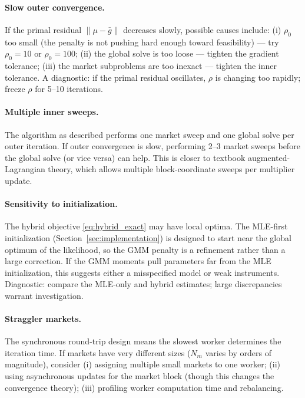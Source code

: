 \documentclass[11pt]{article}
\begin{document}
\paragraph{Slow outer convergence.} If the primal residual $\|\mu-\bar g\|$ decreases slowly, possible causes include: (i) $\rho_0$ too small (the penalty is not pushing hard enough toward feasibility) --- try $\rho_0 = 10$ or $\rho_0 = 100$; (ii) the global solve is too loose --- tighten the gradient tolerance; (iii) the market subproblems are too inexact --- tighten the inner tolerance. A diagnostic: if the primal residual oscillates, $\rho$ is changing too rapidly; freeze $\rho$ for 5--10 iterations.

\paragraph{Multiple inner sweeps.} The algorithm as described performs one market sweep and one global solve per outer iteration. If outer convergence is slow, performing 2--3 market sweeps before the global solve (or vice versa) can help. This is closer to textbook augmented-Lagrangian theory, which allows multiple block-coordinate sweeps per multiplier update.

\paragraph{Sensitivity to initialization.} The hybrid objective \eqref{eq:hybrid_exact} may have local optima. The MLE-first initialization (Section~\ref{sec:implementation}) is designed to start near the global optimum of the likelihood, so the GMM penalty is a refinement rather than a large correction. If the GMM moments pull parameters far from the MLE initialization, this suggests either a misspecified model or weak instruments. Diagnostic: compare the MLE-only and hybrid estimates; large discrepancies warrant investigation.

\paragraph{Straggler markets.} The synchronous round-trip design means the slowest worker determines the iteration time. If markets have very different sizes ($N_m$ varies by orders of magnitude), consider (i) assigning multiple small markets to one worker; (ii) using asynchronous updates for the market block (though this changes the convergence theory); (iii) profiling worker computation time and rebalancing.
\end{document}
